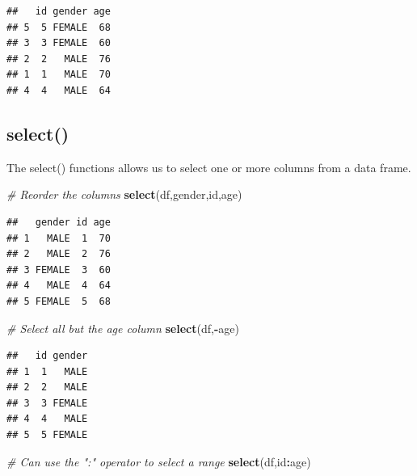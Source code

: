 \documentclass[]{book}
\newenvironment{Shaded}{\begin{snugshade}}{\end{snugshade}}
\newcommand{\CommentTok}[1]{\textcolor[rgb]{0.56,0.35,0.01}{\textit{#1}}}
\newcommand{\KeywordTok}[1]{\textcolor[rgb]{0.13,0.29,0.53}{\textbf{#1}}}
\newcommand{\NormalTok}[1]{#1}
\newcommand{\OperatorTok}[1]{\textcolor[rgb]{0.81,0.36,0.00}{\textbf{#1}}}
\begin{document}
\begin{Shaded}
\end{Shaded}

\begin{verbatim}
##   id gender age
## 5  5 FEMALE  68
## 3  3 FEMALE  60
## 2  2   MALE  76
## 1  1   MALE  70
## 4  4   MALE  64
\end{verbatim}

\hypertarget{select}{%
\subsection{select()}\label{select}}

The select() functions allows us to select one or more columns from a data frame.

\begin{Shaded}
\begin{Highlighting}[]
\CommentTok{# Reorder the columns}
\KeywordTok{select}\NormalTok{(df,gender,id,age)  }
\end{Highlighting}
\end{Shaded}

\begin{verbatim}
##   gender id age
## 1   MALE  1  70
## 2   MALE  2  76
## 3 FEMALE  3  60
## 4   MALE  4  64
## 5 FEMALE  5  68
\end{verbatim}

\begin{Shaded}
\begin{Highlighting}[]
\CommentTok{# Select all but the age column}
\KeywordTok{select}\NormalTok{(df,}\OperatorTok{-}\NormalTok{age)}
\end{Highlighting}
\end{Shaded}

\begin{verbatim}
##   id gender
## 1  1   MALE
## 2  2   MALE
## 3  3 FEMALE
## 4  4   MALE
## 5  5 FEMALE
\end{verbatim}

\begin{Shaded}
\begin{Highlighting}[]
\CommentTok{# Can use the ":" operator to select a range}
\KeywordTok{select}\NormalTok{(df,id}\OperatorTok{:}\NormalTok{age) }
\end{Highlighting}
\end{Shaded}
\end{document}
